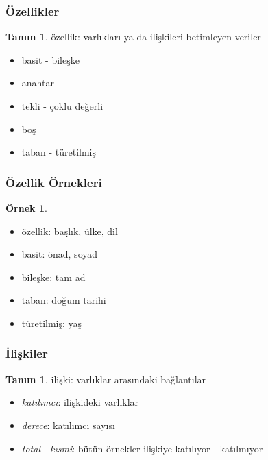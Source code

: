 \documentclass[dvipsnames]{beamer}
\theoremstyle{definition}
\newtheorem{tanim}[theorem]{Tanım}
\theoremstyle{example}
\newtheorem{ornek}[theorem]{Örnek}
\theoremstyle{plain}
\begin{document}
\begin{frame}
  \frametitle{Özellikler}

  \begin{tanim}
    \alert{özellik}: varlıkları ya da ilişkileri betimleyen veriler

    \pause
    \begin{itemize}
      \item basit - bileşke
      \item anahtar
      \item tekli - çoklu değerli
      \item boş
      \item taban - türetilmiş
    \end{itemize}
  \end{tanim}
\end{frame}

\begin{frame}
  \frametitle{Özellik Örnekleri}

  \begin{ornek}
    \begin{itemize}
      \item özellik: başlık, ülke, dil

      \pause
      \medskip
      \item basit: önad, soyad
      \item bileşke: tam ad

      \pause
      \medskip
      \item taban: doğum tarihi
      \item türetilmiş: yaş
    \end{itemize}
  \end{ornek}
\end{frame}

\begin{frame}
  \frametitle{İlişkiler}

  \begin{tanim}
    \alert{ilişki}: varlıklar arasındaki bağlantılar

    \pause
    \begin{itemize}
      \item \emph{katılımcı}: ilişkideki varlıklar
      \item \emph{derece}: katılımcı sayısı
      \item \emph{total} - \emph{kısmi}: bütün örnekler ilişkiye
        katılıyor - katılmıyor
    \end{itemize}
  \end{tanim}
\end{frame}
\end{document}
